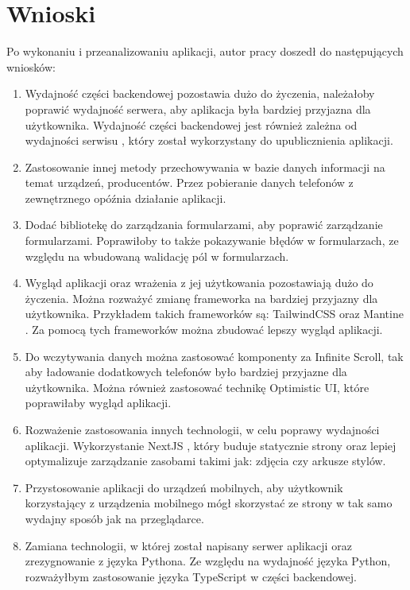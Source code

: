 \section{Wnioski}
Po wykonaniu i przeanalizowaniu aplikacji, autor pracy doszedł do następujących wniosków:
\begin{enumerate}
  \item Wydajność części backendowej pozostawia dużo do życzenia, należałoby poprawić wydajność serwera, aby aplikacja była bardziej przyjazna dla użytkownika. Wydajność części backendowej jest również zależna od wydajności serwisu \cite{render}, który został wykorzystany do upublicznienia aplikacji.
  \item Zastosowanie innej metody przechowywania w bazie danych informacji na temat urządzeń, producentów. Przez pobieranie danych telefonów z zewnętrznego opóźnia działanie aplikacji.
  \item Dodać bibliotekę do zarządzania formularzami, aby poprawić zarządzanie formularzami. Poprawiłoby to także pokazywanie błędów w formularzach, ze względu na wbudowaną walidację pól w formularzach.
  \item Wygląd aplikacji oraz wrażenia z jej użytkowania pozostawiają dużo do życzenia. Można rozważyć zmianę frameworka na bardziej przyjazny dla użytkownika. Przykładem takich frameworków są: TailwindCSS \cite{tailwindcss} oraz Mantine \cite{mantine}. Za pomocą tych frameworków można zbudować lepszy wygląd aplikacji.
  \item Do wczytywania danych można zastosować komponenty za Infinite Scroll, tak aby ładowanie dodatkowych telefonów było bardziej przyjazne dla użytkownika. Można również zastosować technikę Optimistic UI, które poprawiłaby wygląd aplikacji.
  \item Rozważenie zastosowania innych technologii, w celu poprawy wydajności aplikacji. Wykorzystanie NextJS \cite{nextjs}, który buduje statycznie strony oraz lepiej optymalizuje zarządzanie zasobami takimi jak: zdjęcia czy arkusze stylów.
  \item Przystosowanie aplikacji do urządzeń mobilnych, aby użytkownik korzystający z urządzenia mobilnego mógł skorzystać ze strony w tak samo wydajny sposób jak na przeglądarce.
  \item Zamiana technologii, w której został napisany serwer aplikacji oraz zrezygnowanie z języka Pythona. Ze względu na wydajność języka Python, rozważyłbym zastosowanie języka TypeScript w części backendowej.
\end{enumerate}

